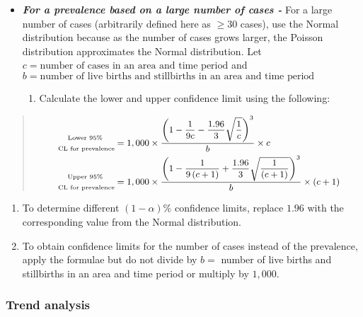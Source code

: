 \documentclass[
]{krantz}
\providecommand{\tightlist}{%
  \setlength{\itemsep}{0pt}\setlength{\parskip}{0pt}}
\begin{document}
\begin{itemize}
\item
  \textbf{\emph{For a prevalence based on a large number of cases -}} For a large number of cases (arbitrarily defined here as \(\ge 30\) cases), use the Normal distribution because as the number of cases grows larger, the Poisson distribution approximates the Normal distribution.
  Let \(c=\text{number of cases in an area and time period}\) and \(b=\text{number of live births and stillbirths in an area and time period}\)

  \begin{enumerate}
  \def\labelenumi{\arabic{enumi}.}
  \tightlist
  \item
    Calculate the lower and upper confidence limit using the following:
  \end{enumerate}
\end{itemize}

\begin{quote}
\[
\small
\begin{aligned}
\substack{\text{Lower } 95\% \\ \\ \text{ CL for prevalence}} &= 1,000 \times \dfrac{\left( 1- \dfrac{1}{9c}-\dfrac{1.96}{3}\sqrt{\dfrac{1}{c}} \right)^{3}}{b}\times c \\
\substack{\text{Upper } 95\% \\ \\ \text{ CL for prevalence}} &= 1,000 \times \dfrac{\left( 1- \dfrac{1}{9\left(c+1\right)}+\dfrac{1.96}{3}\sqrt{\dfrac{1}{\left(c+1\right)}} \right)^{3}}{b}\times \left(c+1\right) 
\end{aligned}
\]
\end{quote}

\begin{enumerate}
\def\labelenumi{\arabic{enumi}.}
\setcounter{enumi}{1}
\tightlist
\item
  To determine different \(\left(1 - \alpha \right) \%\) confidence limits, replace \(1.96\) with the corresponding value from the Normal distribution.
\item
  To obtain confidence limits for the number of cases instead of the prevalence, apply the formulae but do not divide by \(b=\) number of live births and stillbirths in an area and time period or multiply by \(1,000\).
\end{enumerate}

\hypertarget{trend-analysis}{%
\subsubsection*{Trend analysis}\label{trend-analysis}}
\end{document}
